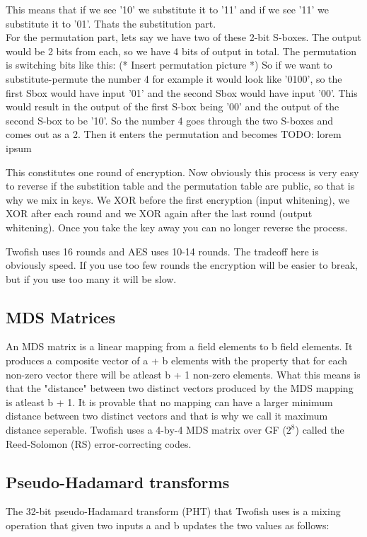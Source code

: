 This means that if we see '10' we substitute it to '11' and if we see '11' we substitute it to '01'. Thats the substitution part. \\
For the permutation part, lets say we have two of these 2-bit S-boxes. The output would be 2 bits from each, so we have 4 bits of output in total. The permutation is switching bits like this:
(* Insert permutation picture *)
So if we want to substitute-permute the number 4 for example it would look like '0100', so the first Sbox would have input '01' and the second Sbox would have input '00'. This would result in the output of the first S-box being '00' and the output of the second S-box to be '10'. So the number 4 goes through the two S-boxes and comes out as a 2. Then it enters the permutation and becomes TODO: lorem ipsum

This constitutes one round of encryption. Now obviously this process is very easy to reverse if the substition table and the permutation table are public, so that is why we mix in keys. We XOR before the first encryption (input whitening), we XOR after each round and we XOR again after the last round (output whitening). Once you take the key away you can no longer reverse the process.

Twofish uses 16 rounds and AES uses 10-14 rounds. The tradeoff here is obviously speed. If you use too few rounds the encryption will be easier to break, but if you use too many it will be slow.


\subsection{MDS Matrices}
An MDS matrix is a linear mapping from a field elements to b field elements. It produces a composite vector of a + b elements with the property that for each non-zero vector there will be atleast b + 1 non-zero elements.
What this means is that the "distance" between two distinct vectors produced by the MDS mapping is atleast b + 1.
It is provable that no mapping can have a larger minimum distance between two distinct vectors and that is why we call it maximum distance seperable.
Twofish uses a 4-by-4 MDS matrix over GF ($2^8$) called the Reed-Solomon (RS) error-correcting codes.

\subsection{Pseudo-Hadamard transforms}
The 32-bit pseudo-Hadamard transform (PHT) that Twofish uses is a mixing operation that given two inputs a and b updates the two values as follows:

